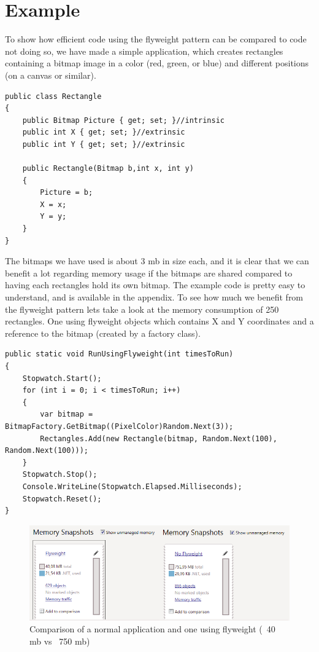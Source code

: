 \section{Example}
To show how efficient code using the flyweight pattern can be compared to code not doing so, we have made a simple application, which creates rectangles containing a bitmap image in a color (red, green, or blue) and different positions (on a canvas or similar).
\lstset{language=C++}
\begin{lstlisting}[caption=The rectangle class]
public class Rectangle
{
	public Bitmap Picture { get; set; }//intrinsic
	public int X { get; set; }//extrinsic
	public int Y { get; set; }//extrinsic

	public Rectangle(Bitmap b,int x, int y)
	{
		Picture = b;
		X = x;
		Y = y;
	}
}
\end{lstlisting}
The bitmaps we have used is about 3 mb in size each, and it is clear that we can benefit a lot regarding memory usage if the bitmaps are shared compared to having each rectangles hold its own bitmap.
The example code is pretty easy to understand, and is available in the appendix.
To see how much we benefit from the flyweight pattern lets take a look at the memory consumption of 250 rectangles. One using flyweight objects which contains X and Y coordinates and a reference to the bitmap (created by a factory class).
\lstset{language=C++}
\begin{lstlisting}[caption=The "testrun" using flyweight]
public static void RunUsingFlyweight(int timesToRun)
{
	Stopwatch.Start();
	for (int i = 0; i < timesToRun; i++)
	{
		var bitmap = BitmapFactory.GetBitmap((PixelColor)Random.Next(3));
		Rectangles.Add(new Rectangle(bitmap, Random.Next(100), Random.Next(100)));
	}
	Stopwatch.Stop();
	Console.WriteLine(Stopwatch.Elapsed.Milliseconds);
	Stopwatch.Reset();
}
\end{lstlisting}
\begin{figure}[h]
\centering
\includegraphics[width=0.7\linewidth]{Content/Flyweight_Stats}
\caption{Comparison of a normal application and one using flyweight (~40 mb vs ~750 mb)}
\label{fig:Flyweight_Stats}
\end{figure}
